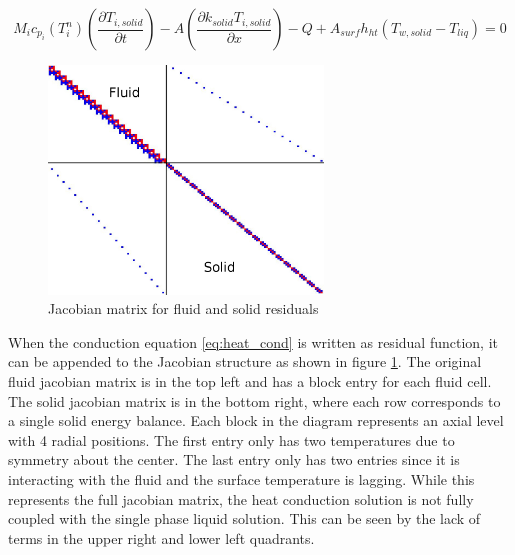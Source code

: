 	\begin{equation}
		M_{i} c_{p_{i}}\left(T_{i}^{n}\right) 
		\left( \frac{\partial T_{i,solid}}{\partial t} \right) 
		- A \left( \frac{\partial k_{solid} T_{i,solid}}{\partial x}\right) - Q 
		+ A_{surf} h_{ht} \left( T_{w,solid} - T_{liq}\right) 
		= 0
		\label{eq:FD:heat_cond}
	\end{equation}
	
	\begin{figure}[!h]
		\centering
    	\includegraphics[width=0.65\textwidth]{images/Heat_Conduction_Jacobian_Diagram}
    	\caption{Jacobian matrix for fluid and solid residuals}
    	\label{fig:solid_liquid_jacobian}
	\end{figure}
	
	When the conduction equation \eqref{eq:heat_cond} is written as residual
	function, it can be appended to the Jacobian structure as shown in figure
	\ref{fig:solid_liquid_jacobian}. The original fluid jacobian matrix is in the
	top left and has a block entry for each fluid cell. The solid jacobian matrix
	is in the bottom right, where each row corresponds to a single solid energy
	balance. Each block in the diagram represents an axial level with 4 radial
	positions. The first entry only has two temperatures due to symmetry about the
	center. The last entry only has two entries since it is interacting with the
	fluid and the surface temperature is lagging. While this represents the full
	jacobian matrix, the heat conduction solution is not fully coupled with the
	single phase liquid solution. This can be seen by the lack of terms in the
	upper right and lower left quadrants.
